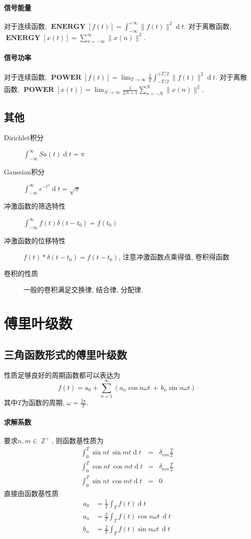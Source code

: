 \documentclass{ctexart}
\DeclareMathOperator{\ENERGY}{\mathbf{ENERGY}}
\DeclareMathOperator{\POWER}{\mathbf{POWER}}
\DeclareMathOperator{\ud}{\mathrm{d}}
\DeclareMathOperator{\Zset}{\mathbb{Z}}
\begin{document}
\paragraph{信号能量} 对于连续函数, $\ENERGY[f(t)] = \int_{-\infty}^{+\infty} \|f(t)\|^2 \ud t$.
    对于离散函数, $\ENERGY[x(t)] = \sum_{n = -\infty}^{\infty} \|x(n)\|^2$.
\paragraph{信号功率} 对于连续函数, $\POWER[f(t)] = \lim_{T \to \infty} \frac{1}{T} \int_{-T/2}^{+T/2} \|f(t)\|^2 \ud t$.
    对于离散函数, $\POWER[x(t)] = \lim_{N \to \infty} \frac{1}{2N + 1} \sum_{n = -N}^{N} \|x(n)\|^2$.
\subsection{其他}
    \begin{description}
        \item[Dirichlet积分] $\int_{-\infty}^{\infty} Sa(t) \ud t = \pi$
        \item[Gaussian积分] $\int_{-\infty}^{\infty} e^{-t^2} \ud t = \sqrt{\pi}$
        \item[冲激函数的筛选特性] $\int_{-\infty}^{\infty} f(t) \delta(t - t_0) = f(t_0)$
        \item[冲激函数的位移特性] $f(t) * \delta(t - t_0) = f(t - t_0)$, 注意冲激函数点乘得值, 卷积得函数
        \item[卷积的性质] 一般的卷积满足交换律, 结合律, 分配律.
    \end{description}

\section{傅里叶级数}
\subsection{三角函数形式的傅里叶级数}
    性质足够良好的周期函数都可以表达为\[
        f(t) = a_0 + \sum_{n = 1}^{\infty} \left( a_n \cos n\omega t \,+\, b_n \sin n\omega t \right)\]
    其中$T$为函数的周期, $\omega = \frac{2\pi}{T}$.
\paragraph{求解系数}
    要求$n, m \in \Zset^+$, 则函数基性质为\begin{eqnarray*}
        \int_0^{T} \sin nt\, \sin mt \ud t &=& \delta_{nm} \frac{T}{2}\\
        \int_0^{T} \cos nt\, \cos mt \ud t &=& \delta_{nm} \frac{T}{2} \\
        \int_0^{T} \sin nt\, \cos mt \ud t &=& 0
    \end{eqnarray*}
    直接由函数基性质\begin{align*}
        a_0 &= \frac{1}{T} \int_T f(t) \ud t\\
        a_n &= \frac{2}{T} \int_T f(t) \cos n\omega t \,\ud t\\
        b_n &= \frac{2}{T} \int_T f(t) \sin n\omega t \,\ud t
    \end{align*}
\end{document}
